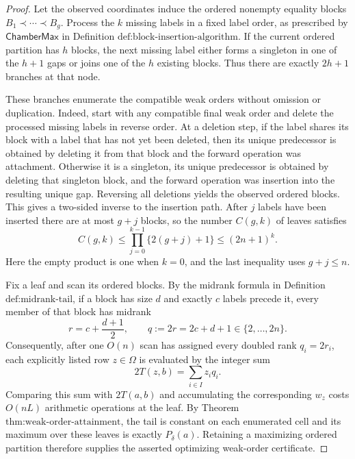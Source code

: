 \documentclass{article}
\begin{document}
\begin{proof}
Let the observed coordinates induce the ordered nonempty equality blocks
\(B_1\prec\cdots\prec B_g\).  Process the \(k\) missing labels in a fixed
label order, as prescribed by \(\mathsf{ChamberMax}\) in
Definition \(\text{def:block-insertion-algorithm}\).  If the current ordered
partition has \(h\) blocks, the next missing label either forms a singleton
in one of the \(h+1\) gaps or joins one of the \(h\) existing blocks.  Thus
there are exactly \(2h+1\) branches at that node.

These branches enumerate the compatible weak orders without omission or
duplication.  Indeed, start with any compatible final weak order and delete
the processed missing labels in reverse order.  At a deletion step, if the
label shares its block with a label that has not yet been deleted, then its
unique predecessor is obtained by deleting it from that block and the forward
operation was attachment.  Otherwise it is a singleton, its unique predecessor
is obtained by deleting that singleton block, and the forward operation was
insertion into the resulting unique gap.  Reversing all deletions yields the
observed ordered blocks.  This gives a two-sided inverse to the insertion path.
After \(j\) labels have been inserted there are at most \(g+j\) blocks, so the
number \(C(g,k)\) of leaves satisfies
\[
 C(g,k)\le \prod_{j=0}^{k-1}\{2(g+j)+1\}
 \le (2n+1)^k.
\]
Here the empty product is one when \(k=0\), and the last inequality uses
\(g+j\le n\).

Fix a leaf and scan its ordered blocks.  By the midrank formula in
Definition \(\text{def:midrank-tail}\), if a block has size \(d\) and exactly
\(c\) labels precede it, every member of that block has midrank
\[
 r=c+\frac{d+1}{2},
 \qquad q:=2r=2c+d+1\in\{2,\ldots,2n\}.
\]
Consequently, after one \(O(n)\) scan has assigned every doubled rank
\(q_i=2r_i\), each explicitly listed row \(z\in\Omega\) is evaluated by the
integer sum
\[
 2T(z,b)=\sum_{i\in I}z_iq_i.
\]
Comparing this sum with \(2T(a,b)\) and accumulating the corresponding
\(w_z\) costs \(O(nL)\) arithmetic operations at the leaf.  By
Theorem \(\text{thm:weak-order-attainment}\), the tail is constant on each
enumerated cell and its maximum over these leaves is exactly
\(P_\delta(a)\).  Retaining a maximizing ordered partition therefore supplies
the asserted optimizing weak-order certificate.


\end{proof}
\end{document}
